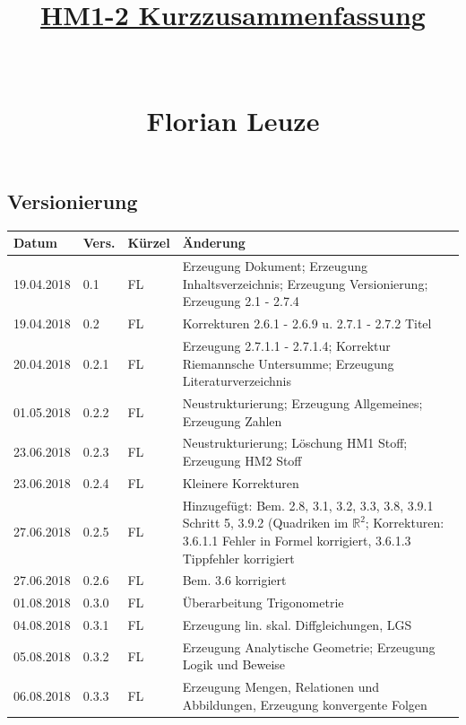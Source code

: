 \documentclass[12pt,a4paper]{report}%
\numberwithin{equation}{section}
\newcommand{\R}{\mathbb{R}} %
\numberwithin{equation}{subsection}
\begin{document}


\author{}
\title{\underline{HM1-2 Kurzzusammenfassung} \\ $\;$ \\ $\;$ \\ Florian Leuze}
\date{}

\maketitle %
\newpage

\tableofcontents

  \subsection*{Versionierung}
  \begin{tabular}{|p{2cm}|p{1cm}|p{1.5cm}|p{8.5cm}|}\hline
    Datum & Vers. & Kürzel & Änderung \\ \hline
    19.04.2018 & 0.1 & FL & Erzeugung Dokument; Erzeugung Inhaltsverzeichnis; Erzeugung Versionierung; Erzeugung 2.1 - 2.7.4 \\ \hline
    19.04.2018 & 0.2 & FL & Korrekturen 2.6.1 - 2.6.9 u. 2.7.1 - 2.7.2 Titel\\ \hline
    20.04.2018 & 0.2.1 & FL & Erzeugung 2.7.1.1 - 2.7.1.4; Korrektur Riemannsche Untersumme; Erzeugung Literaturverzeichnis \\ \hline
    01.05.2018 & 0.2.2 & FL & Neustrukturierung; Erzeugung Allgemeines; Erzeugung Zahlen \\ \hline
    23.06.2018 & 0.2.3 & FL & Neustrukturierung; Löschung HM1 Stoff; Erzeugung HM2 Stoff \\ \hline
    23.06.2018 & 0.2.4 & FL & Kleinere Korrekturen \\ \hline
    27.06.2018 & 0.2.5 & FL & Hinzugefügt: Bem. 2.8, 3.1, 3.2, 3.3, 3.8, 3.9.1 Schritt 5, 3.9.2 (Quadriken im $\R^2$; Korrekturen: 3.6.1.1 Fehler in Formel korrigiert, 3.6.1.3 Tippfehler korrigiert \\ \hline
    27.06.2018 & 0.2.6 & FL &  Bem. 3.6 korrigiert \\ \hline
    01.08.2018 & 0.3.0 & FL & Überarbeitung Trigonometrie \\ \hline
    04.08.2018 & 0.3.1 & FL & Erzeugung lin. skal. Diffgleichungen, LGS \\ \hline
    05.08.2018 & 0.3.2 & FL & Erzeugung Analytische Geometrie; Erzeugung Logik und Beweise \\ \hline
    06.08.2018 & 0.3.3 & FL & Erzeugung Mengen, Relationen und Abbildungen, Erzeugung konvergente Folgen \\ \hline

\end{tabular}
\end{document}
